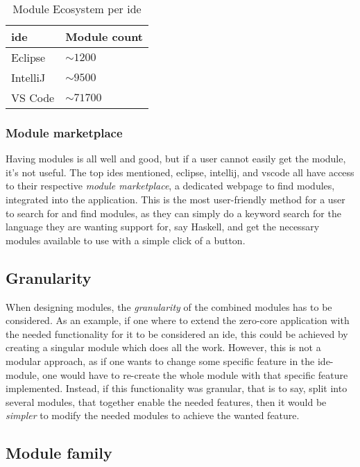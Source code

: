 \begin{table}[]
  \centering
  \caption{Module Ecosystem per \gls*{ide}}
  \label{tbl:mod}
  \begin{tabular}{|l|l|}
    \hline
    \gls*{ide} & Module count \\ \hline
    Eclipse & $\sim1200$ \\ \hline
    IntelliJ & $\sim9500$ \\ \hline
    VS Code & $\sim71700$ \\ \hline
  \end{tabular}
\end{table}

\subsubsection{Module marketplace}

Having modules is all well and good, but if a user cannot easily get the
module, it's not useful. The top \gls*{ide}s mentioned, \gls*{eclipse},
\gls*{intellij}, and \gls*{vscode} all have access to their respective
\textit{module marketplace}, a dedicated webpage to find modules, integrated
into the application. This is the most user-friendly method for a user to search
for and find modules, as they can simply do a keyword search for the language
they are wanting support for, say Haskell, and get the necessary modules
available to use with a simple click of a button.

\subsection{Granularity}

When designing modules, the \textit{granularity} of the combined modules has to
be considered. As an example, if one where to extend the zero-core application
with the needed functionality for it to be considered an \gls*{ide}, this could be
achieved by creating a singular module which does all the work. However, this
is not a modular approach, as if one wants to change some specific feature in
the \gls*{ide}-module, one would have to re-create the whole module with that
specific feature implemented. Instead, if this functionality was granular,
that is to say, split into several modules, that together enable the needed
features, then it would be \textit{simpler} to modify the needed modules to
achieve the wanted feature.


\subsection{Module family}

